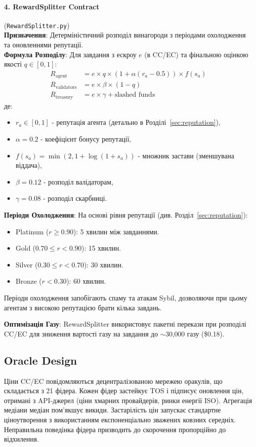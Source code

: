 \documentclass[11pt]{article}
\begin{document}
\paragraph{4. RewardSplitter Contract} (\texttt{RewardSplitter.py})\\
\textbf{Призначення}: Детерміністичний розподіл винагороди з періодами охолодження та оновленнями репутації.\\
\textbf{Формула Розподілу}: Для завдання з ескроу $e$ (в CC/EC) та фінальною оцінкою якості $q \in [0,1]$:
\begin{align}
R_{\text{agent}} &= e \times q \times \left(1 + \alpha (r_a - 0.5)\right) \times f(s_a) \label{eq:reward-agent} \\
R_{\text{validators}} &= e \times \beta \times (1-q) \label{eq:reward-validators} \\
R_{\text{treasury}} &= e \times \gamma + \text{slashed funds} \label{eq:reward-treasury}
\end{align}
де:
\begin{itemize}[noitemsep]
  \item $r_a \in [0,1]$ - репутація агента (детально в Розділі~\ref{sec:reputation}),
  \item $\alpha = 0.2$ - коефіцієнт бонусу репутації,
  \item $f(s_a) = \min(2, 1 + \log(1+s_a))$ - множник застави (зменшувана віддача),
  \item $\beta = 0.12$ - розподіл валідаторам,
  \item $\gamma = 0.08$ - розподіл скарбниці.
\end{itemize}
\textbf{Періоди Охолодження}: На основі рівня репутації (див. Розділ~\ref{sec:reputation}):
\begin{itemize}[noitemsep]
  \item Platinum ($r \geq 0.90$): 5 хвилин між завданнями.
  \item Gold ($0.70 \leq r < 0.90$): 15 хвилин.
  \item Silver ($0.30 \leq r < 0.70$): 30 хвилин.
  \item Bronze ($r < 0.30$): 60 хвилин.
\end{itemize}
Періоди охолодження запобігають спаму та атакам Sybil, дозволяючи при цьому агентам з високою репутацією брати кілька завдань.

\textbf{Оптимізація Газу}: RewardSplitter використовує пакетні перекази при розподілі CC/EC для зниження вартості газу на завдання до $\sim$30,000 газу (\$0.18).

\subsection{Oracle Design}
Ціни CC/EC повідомляються децентралізованою мережею оракулів, що складається з 21 фідера. Кожен фідер застейкує TOS і підписує оновлення цін, отримані з API-джерел (ціни хмарних провайдерів, ринки енергії ISO). Агрегація медіани медіан пом'якшує викиди. Застарілість цін запускає стандартне ціноутворення з використанням експоненціально зважених ковзних середніх. Неправильна поведінка фідера призводить до скорочення пропорційно до відхилення.
\end{document}
